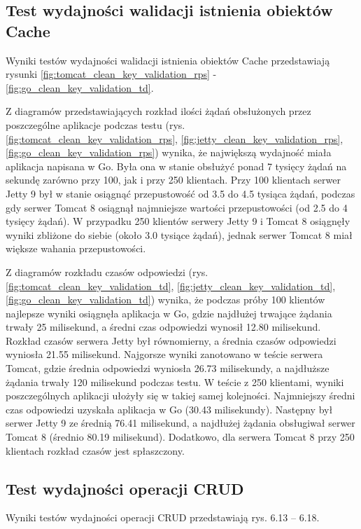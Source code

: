 
\clearpage

\subsection{Test wydajności walidacji istnienia obiektów Cache}
Wyniki testów wydajności walidacji istnienia obiektów Cache przedstawiają rysunki \ref{fig:tomcat_clean_key_validation_rps} - \ref{fig:go_clean_key_validation_td}.              

Z diagramów przedstawiających rozkład  ilości żądań obsłużonych przez poszczególne aplikacje podczas testu (rys. \ref{fig:tomcat_clean_key_validation_rps}, \ref{fig:jetty_clean_key_validation_rps}, \ref{fig:go_clean_key_validation_rps}) wynika, że największą wydajność miała aplikacja napisana w Go. Była ona w stanie obsłużyć ponad 7 tysięcy żądań na sekundę zarówno przy 100, jak i przy 250 klientach. Przy 100 klientach serwer Jetty 9 był w stanie osiągnąć przepustowość od 3.5 do 4.5 tysiąca żądań, podczas gdy serwer Tomcat 8 osiągnął najmniejsze wartości przepustowości (od 2.5 do 4 tysięcy żądań). W przypadku 250 klientów serwery Jetty 9 i Tomcat 8 osiągnęły wyniki zbliżone do siebie  (około 3.0 tysiące żądań),  jednak  serwer Tomcat 8 miał większe wahania przepustowości.

Z diagramów rozkładu czasów odpowiedzi (rys. \ref{fig:tomcat_clean_key_validation_td}, \ref{fig:jetty_clean_key_validation_td}, \ref{fig:go_clean_key_validation_td}) wynika, że podczas próby 100 klientów najlepsze wyniki osiągnęła aplikacja w Go, gdzie najdłużej trwające żądania trwały 25 milisekund, a średni czas odpowiedzi wynosił  12.80 milisekund. Rozkład czasów serwera Jetty był równomierny, a średnia czasów odpowiedzi wyniosła 21.55 milisekund. Najgorsze wyniki zanotowano w teście serwera Tomcat, gdzie średnia odpowiedzi wyniosła 26.73 milisekundy, a najdłuższe żądania trwały 120 milisekund podczas testu. W teście z 250 klientami, wyniki poszczególnych aplikacji ułożyły się w takiej samej kolejności. Najmniejszy  średni czas odpowiedzi  uzyskała  aplikacja w Go (30.43 milisekundy). Następny był serwer Jetty 9 ze średnią 76.41 milisekund, a najdłużej żądania obsługiwał serwer Tomcat 8 (średnio 80.19 milisekund). Dodatkowo, dla serwera Tomcat 8 przy 250 klientach rozkład czasów jest spłaszczony. 

\clearpage

\subsection{Test wydajności operacji CRUD}
Wyniki testów wydajności operacji CRUD przedstawiają  rys. 6.13 – 6.18.

